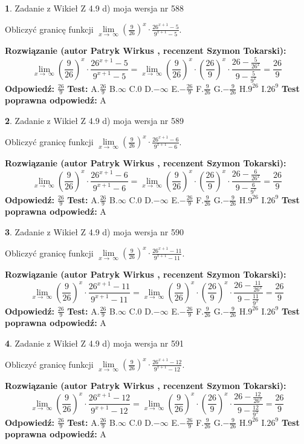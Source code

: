 \documentclass[12pt, a4paper]{article}
\theoremstyle{definition} %
\newtheorem{zad}{}
\newcommand{\zadStart}[1]{\begin{zad}#1\newline}
\newcommand{\zadStop}{\end{zad}}
\newcommand{\rozwStart}[2]{\noindent \textbf{Rozwiązanie (autor #1 , recenzent #2): }\newline}
\newcommand{\rozwStop}{\newline}
\newcommand{\odpStart}{\noindent \textbf{Odpowiedź:}\newline}
\newcommand{\odpStop}{\newline}
\newcommand{\testStart}{\noindent \textbf{Test:}\newline}
\newcommand{\testStop}{\newline}
\newcommand{\kluczStart}{\noindent \textbf{Test poprawna odpowiedź:}\newline}
\newcommand{\kluczStop}{\newline}
\begin{document}
\zadStart{Zadanie z Wikieł Z 4.9 d) moja wersja nr 588}


Obliczyć granicę funkcji  $\lim\limits_{x\to\ \infty}(\frac{9}{26})^{x}\cdot\frac{26^{x+1}-5}{9^{x+1}-5}$.
\zadStop
\rozwStart{Patryk Wirkus}{Szymon Tokarski}
$$\lim\limits_{x\to\ \infty}(\frac{9}{26})^{x}\cdot\frac{26^{x+1}-5}{9^{x+1}-5}=\lim\limits_{x\to\ \infty}(\frac{9}{26})^{x}\cdot(\frac{26}{9})^{x} \cdot \frac{26-\frac{5}{26^{x}}}{9-\frac{5}{9^{x}}} = \frac{26}{9}$$
\rozwStop
\odpStart
$\frac{26}{9}$
\odpStop
\testStart
A.$\frac{26}{9}$ B.$\infty$ C.$0$ D.$-\infty$ E.$-\frac{26}{9}$
F.$\frac{9}{26}$ G.$-\frac{9}{26}$
H.$9^{26}$
I.$26^{9}$
\testStop
\kluczStart
A
\kluczStop



\zadStart{Zadanie z Wikieł Z 4.9 d) moja wersja nr 589}


Obliczyć granicę funkcji  $\lim\limits_{x\to\ \infty}(\frac{9}{26})^{x}\cdot\frac{26^{x+1}-6}{9^{x+1}-6}$.
\zadStop
\rozwStart{Patryk Wirkus}{Szymon Tokarski}
$$\lim\limits_{x\to\ \infty}(\frac{9}{26})^{x}\cdot\frac{26^{x+1}-6}{9^{x+1}-6}=\lim\limits_{x\to\ \infty}(\frac{9}{26})^{x}\cdot(\frac{26}{9})^{x} \cdot \frac{26-\frac{6}{26^{x}}}{9-\frac{6}{9^{x}}} = \frac{26}{9}$$
\rozwStop
\odpStart
$\frac{26}{9}$
\odpStop
\testStart
A.$\frac{26}{9}$ B.$\infty$ C.$0$ D.$-\infty$ E.$-\frac{26}{9}$
F.$\frac{9}{26}$ G.$-\frac{9}{26}$
H.$9^{26}$
I.$26^{9}$
\testStop
\kluczStart
A
\kluczStop



\zadStart{Zadanie z Wikieł Z 4.9 d) moja wersja nr 590}


Obliczyć granicę funkcji  $\lim\limits_{x\to\ \infty}(\frac{9}{26})^{x}\cdot\frac{26^{x+1}-11}{9^{x+1}-11}$.
\zadStop
\rozwStart{Patryk Wirkus}{Szymon Tokarski}
$$\lim\limits_{x\to\ \infty}(\frac{9}{26})^{x}\cdot\frac{26^{x+1}-11}{9^{x+1}-11}=\lim\limits_{x\to\ \infty}(\frac{9}{26})^{x}\cdot(\frac{26}{9})^{x} \cdot \frac{26-\frac{11}{26^{x}}}{9-\frac{11}{9^{x}}} = \frac{26}{9}$$
\rozwStop
\odpStart
$\frac{26}{9}$
\odpStop
\testStart
A.$\frac{26}{9}$ B.$\infty$ C.$0$ D.$-\infty$ E.$-\frac{26}{9}$
F.$\frac{9}{26}$ G.$-\frac{9}{26}$
H.$9^{26}$
I.$26^{9}$
\testStop
\kluczStart
A
\kluczStop



\zadStart{Zadanie z Wikieł Z 4.9 d) moja wersja nr 591}


Obliczyć granicę funkcji  $\lim\limits_{x\to\ \infty}(\frac{9}{26})^{x}\cdot\frac{26^{x+1}-12}{9^{x+1}-12}$.
\zadStop
\rozwStart{Patryk Wirkus}{Szymon Tokarski}
$$\lim\limits_{x\to\ \infty}(\frac{9}{26})^{x}\cdot\frac{26^{x+1}-12}{9^{x+1}-12}=\lim\limits_{x\to\ \infty}(\frac{9}{26})^{x}\cdot(\frac{26}{9})^{x} \cdot \frac{26-\frac{12}{26^{x}}}{9-\frac{12}{9^{x}}} = \frac{26}{9}$$
\rozwStop
\odpStart
$\frac{26}{9}$
\odpStop
\testStart
A.$\frac{26}{9}$ B.$\infty$ C.$0$ D.$-\infty$ E.$-\frac{26}{9}$
F.$\frac{9}{26}$ G.$-\frac{9}{26}$
H.$9^{26}$
I.$26^{9}$
\testStop
\kluczStart
A
\kluczStop
\end{document}

